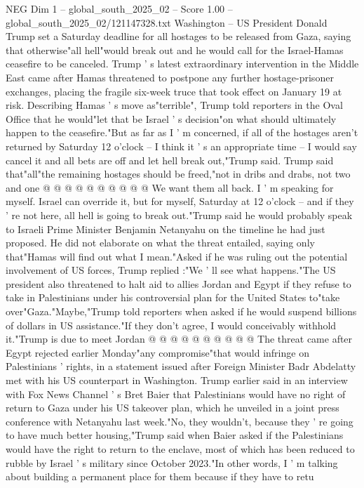 \begin{textsample}{NEG Dim 1 – global\_south\_2025\_02 – Score 1.00 – global\_south\_2025\_02/121147328.txt}  \label{ex:f1_neg_038}
Washington -- US President Donald Trump set a Saturday deadline for all hostages to be released from Gaza, saying that otherwise"all hell"would break out and he would call for the Israel-Hamas ceasefire to be canceled.
Trump ' s latest extraordinary intervention in the Middle East came after Hamas threatened to postpone any further hostage-prisoner exchanges, placing the fragile six-week truce that took effect on January 19 at risk.
Describing Hamas ' s move as"terrible", Trump told reporters in the Oval Office that he would"let that be Israel ' s decision"on what should ultimately happen to the ceasefire."But as far as I ' m concerned, if all of the hostages aren't returned by Saturday 12 o'clock -- I think it ' s an appropriate time -- I would say cancel it and all bets are off and let hell break out,"Trump said.
Trump said that"all"the remaining hostages should be freed,"not in dribs and drabs, not two and one @ @ @ @ @ @ @ @ @ @ We want them all back.
I ' m speaking for myself.
Israel can override it, but for myself, Saturday at 12 o'clock -- and if they ' re not here, all hell is going to break out."Trump said he would probably speak to Israeli Prime Minister Benjamin Netanyahu on the timeline he had just proposed.
He did not elaborate on what the threat entailed, saying only that"Hamas will find out what I mean."Asked if he was ruling out the potential involvement of US forces, Trump replied :"We ' ll see what happens."The US president also threatened to halt aid to allies Jordan and Egypt if they refuse to take in Palestinians under his controversial plan for the United States to"take over"Gaza."Maybe,"Trump told reporters when asked if he would suspend billions of dollars in US assistance."If they don't agree, I would conceivably withhold it."Trump is due to meet Jordan @ @ @ @ @ @ @ @ @ @ The threat came after Egypt rejected earlier Monday"any compromise"that would infringe on Palestinians ' rights, in a statement issued after Foreign Minister Badr Abdelatty met with his US counterpart in Washington.
Trump earlier said in an interview with Fox News Channel ' s Bret Baier that Palestinians would have no right of return to Gaza under his US takeover plan, which he unveiled in a joint press conference with Netanyahu last week."No, they wouldn't, because they ' re going to have much better housing,"Trump said when Baier asked if the Palestinians would have the right to return to the enclave, most of which has been reduced to rubble by Israel ' s military since October 2023."In other words, I ' m talking about building a permanent place for them because if they have to retu

\end{textsample}
